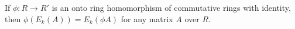 If $\phi: R \to R'$ is an onto ring homomorphism of commutative rings with identity, then $\phi(E_k(A)) = E_k(\phi A)$ for any matrix $A$ over $R$.
